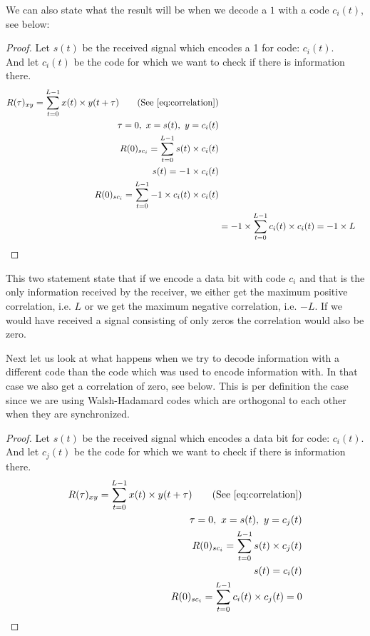 		We can also state what the result will be when we decode a $1$ with a code $c_i(t)$, see below:

		\begin{proof}
			Let $s(t)$ be the received signal which encodes a 1 for code: $c_i(t)$.\\
			And let $c_i(t)$ be the code for which we want to check if there is information there. \\

			\begin{align*}
				R(\tau)_{xy} = \displaystyle\sum_{t = 0} ^ {L - 1} x(t) \times y(t + \tau)	\tag{See \autoref{eq:correlation}}
				\\ \tau = 0,\ x = s(t),\ y = c_i(t)	
				\\ R(0)_{sc_{i}} = \displaystyle\sum_{t = 0} ^ {L - 1} s(t) \times c_i(t)	
				\\ s(t) = -1 \times c_i(t)															
				\\ R(0)_{sc_{i}} = \displaystyle\sum_{t = 0} ^ {L - 1} -1 \times c_i(t) \times c_i(t)
				\\ &= -1 \times \displaystyle\sum_{t = 0} ^ {L - 1} c_i(t) \times c_i(t) = -1 \times L
			\end{align*}

		\end{proof}

		This two statement state that if we encode a data bit with code $c_i$ and that is the only information received by the receiver, we either get the maximum positive correlation, i.e. $L$ or we get the maximum negative correlation, i.e. $-L$.
		If we would have received a signal consisting of only zeros the correlation would also be zero.

		Next let us look at what happens when we try to decode information with a different code than the code which was used to encode information with. In that case we also get a correlation of zero, see below. This is per definition the case since we are using Walsh-Hadamard codes which are orthogonal to each other when they are synchronized.

		\begin{proof}
			Let $s(t)$ be the received signal which encodes a data bit for code: $c_i(t)$.\\
			And let $c_j(t)$ be the code for which we want to check if there is information there. \\

			\begin{align*}
				R(\tau)_{xy} = \displaystyle\sum_{t = 0} ^ {L - 1} x(t) \times y(t + \tau)	\tag{See \autoref{eq:correlation}}
				\\ \tau = 0,\ x = s(t),\ y = c_j(t)	
				\\ R(0)_{sc_{i}} = \displaystyle\sum_{t = 0} ^ {L - 1} s(t) \times c_j(t)	
				\\ s(t) = c_i(t)															
				\\ R(0)_{sc_{i}} = \displaystyle\sum_{t = 0} ^ {L - 1} c_i(t) \times c_j(t) = 0
			\end{align*}

		\end{proof}


